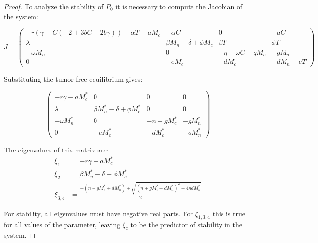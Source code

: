 \documentclass[11pt]{article}
\theoremstyle{definition}
\begin{document}
\begin{proof}
To analyze the stability of $P_0$ it is necessary to compute the Jacobian of the system: 

\begin{center}
$$J = \left(\begin{smallmatrix}
-r(\gamma + C(-2 + 3bC - 2b\gamma)) - \alpha T- aM_c & -\alpha C & 0 & -aC \\
\lambda & \beta M_n - \delta + \phi M_c & \beta T & \phi T \\
-\omega M_n & 0 & -\eta - \omega C - gM_c & -gM_n \\
0 & -eM_c & -dM_c & -dM_n - eT
\end{smallmatrix}\right)$$
\end{center}
Substituting the tumor free equilibrium gives: 
\\
\begin{center}
  $$ \begin{pmatrix}
-r\gamma - aM_c^* & 0 & 0 & 0 \\
\lambda & \beta M_n^* - \delta + \phi M_c^* & 0 & 0 \\
-\omega M_n^* & 0 & -n - gM_c^* & -gM_n^* \\
0 & -eM_c^* & -dM_c^* & -dM_n^*
\end{pmatrix}
  $$
\end{center}

\noindent The eigenvalues of this matrix are: 
$$
\begin{aligned}
  \xi_1 &= -r\gamma - aM_c^*\\
  \xi_2 &= \beta M_n^* - \delta + \phi M_c^*\\
  \xi_{3,4} &= \frac{-(n + gM_c^* + dM_n^*) \pm \sqrt{(n + gM_c^* + dM_n^*)^2 - 4ndM_n^*}}{2}
\end{aligned}
$$

\noindent For stability, all eigenvalues must have negative real parts. For $\xi_{1,3,4}$ this is true for all values of the parameter, leaving 
$\xi_2$ to be the predictor of stability in the system. 
\end{proof}
\end{document}
